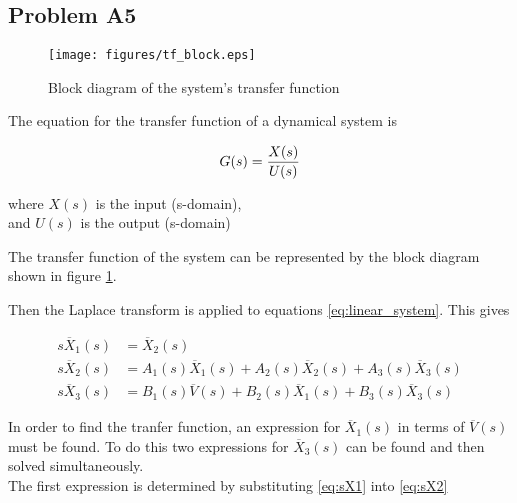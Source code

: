 \documentclass[a4paper,10pt,reqno]{amsart}
\numberwithin{equation}{section}
\begin{document}
\subsection{Problem A5}\label{sec:a5}\hfill

\setlength{\jot}{5pt} %

\begin{figure}[H]
     \texttt{[image: figures/tf\_block.eps]}
     \caption{Block diagram of the system's transfer function}
     \label{fig:tfBlock}
\end{figure}

The equation for the transfer function of a dynamical system is

\begin{equation}
     G(s) = \frac{X(s)}{U(s)} \label{eq:TF} \\
\end{equation}

\begin{center}
     where $X(s)$ is the input (s-domain), \\
     and $U(s)$ is the output (s-domain)
\end{center}
\vspace{10pt}

The transfer function of the system can be represented by the block diagram shown in figure \ref{fig:tfBlock}.

Then the Laplace transform is applied to equations \ref{eq:linear_system}. This gives

\begin{subequations} \label{eq:SysLT}
    \begin{align}
         s\overline{X}_1(s) &= \overline{X}_2(s) \label{eq:sX1} \\
         s\overline{X}_2(s) &= A_1(s)\overline{X}_1(s) + A_2(s)\overline{X}_2(s) + A_3(s)\overline{X}_3(s) \label{eq:sX2} \\
         s\overline{X}_3(s) &= B_1(s)\overline{V}(s) + B_2(s)\overline{X}_1(s) + B_3(s)\overline{X}_3(s) \label{eq:sX4}
    \end{align}
\end{subequations}
\vspace{1pt}

In order to find the tranfer function, an expression for $\overline{X}_1(s)$ in terms of $\overline{V}(s)$ must be found. To do this two expressions for $\overline{X}_3(s)$ can be found and then solved simultaneously.\\
The first expression is determined by substituting \ref{eq:sX1} into \ref{eq:sX2}
\end{document}
